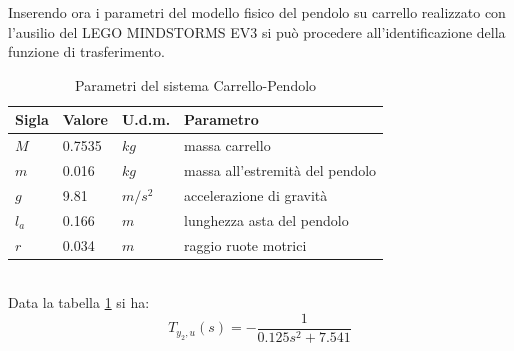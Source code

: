 Inserendo ora i parametri del modello fisico del pendolo su  carrello realizzato con l'ausilio del LEGO MINDSTORMS EV3 si può procedere all'identificazione della funzione di trasferimento.
\begin{table}[ht]
	\begin{tabular}{|l|l|l|l|}
		\hline
		\textbf{Sigla} & \textbf{Valore} & \textbf{U.d.m.} & \textbf{Parametro}\\
		\hline
		$M$ & 0.7535 & $kg$ & massa carrello\\
		\hline
		$m$ & 0.016 & $kg$ & massa all'estremità del pendolo\\
		\hline
		$g$ & 9.81 & $m/s^2$ & accelerazione di gravità\\
		\hline
		$l_a$ & 0.166 & $m$ & lunghezza asta del pendolo\\
		\hline
		$r$ & 0.034 & $m$ & raggio ruote motrici\\
		\hline
	
	\end{tabular}	
\caption{Parametri del sistema Carrello-Pendolo}
\label{carrPend}
\end{table}
\\Data la tabella \ref{carrPend} si ha:
$$T_{y_2,u}(s)=-\displaystyle\frac{1}{0.125s^2+7.541}$$
\newpage
